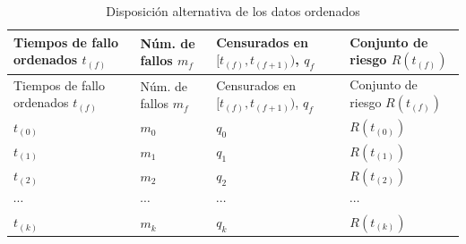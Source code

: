 \documentclass[
]{article}
\begin{document}
\begin{longtable}[]{@{}
  >{\raggedright\arraybackslash}p{}
  >{\raggedright\arraybackslash}p{}
  >{\raggedright\arraybackslash}p{}
  >{\raggedright\arraybackslash}p{}@{}}
\caption{Disposición alternativa de los datos ordenados}\tabularnewline
\toprule\noalign{}
\begin{minipage}[b]{\linewidth}\raggedright
Tiempos de fallo ordenados \(t_{(f)}\)
\end{minipage} & \begin{minipage}[b]{\linewidth}\raggedright
Núm. de fallos \(m_f\)
\end{minipage} & \begin{minipage}[b]{\linewidth}\raggedright
Censurados en \([t_{(f)}, t_{(f+1)})\), \(q_f\)
\end{minipage} & \begin{minipage}[b]{\linewidth}\raggedright
Conjunto de riesgo \(R(t_{(f)})\)
\end{minipage} \\
\midrule\noalign{}
\endfirsthead
\toprule\noalign{}
\begin{minipage}[b]{\linewidth}\raggedright
Tiempos de fallo ordenados \(t_{(f)}\)
\end{minipage} & \begin{minipage}[b]{\linewidth}\raggedright
Núm. de fallos \(m_f\)
\end{minipage} & \begin{minipage}[b]{\linewidth}\raggedright
Censurados en \([t_{(f)}, t_{(f+1)})\), \(q_f\)
\end{minipage} & \begin{minipage}[b]{\linewidth}\raggedright
Conjunto de riesgo \(R(t_{(f)})\)
\end{minipage} \\
\midrule\noalign{}
\endhead
\bottomrule\noalign{}
\endlastfoot
\(t_{(0)}\) & \(m_0\) & \(q_0\) & \(R(t_{(0)})\) \\
\(t_{(1)}\) & \(m_1\) & \(q_1\) & \(R(t_{(1)})\) \\
\(t_{(2)}\) & \(m_2\) & \(q_2\) & \(R(t_{(2)})\) \\
\(\cdots\) & \(\cdots\) & \(\cdots\) & \(\cdots\) \\
\(t_{(k)}\) & \(m_k\) & \(q_k\) & \(R(t_{(k)})\) \\
\end{longtable}
\end{document}
